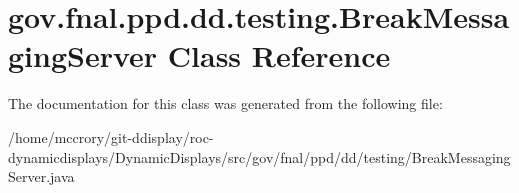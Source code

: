 \hypertarget{classgov_1_1fnal_1_1ppd_1_1dd_1_1testing_1_1BreakMessagingServer}{\section{gov.\-fnal.\-ppd.\-dd.\-testing.\-Break\-Messaging\-Server Class Reference}
\label{classgov_1_1fnal_1_1ppd_1_1dd_1_1testing_1_1BreakMessagingServer}
}


The documentation for this class was generated from the following file\-:\begin{DoxyCompactItemize}
\item 
/home/mccrory/git-\/ddisplay/roc-\/dynamicdisplays/\-Dynamic\-Displays/src/gov/fnal/ppd/dd/testing/Break\-Messaging\-Server.\-java\end{DoxyCompactItemize}
